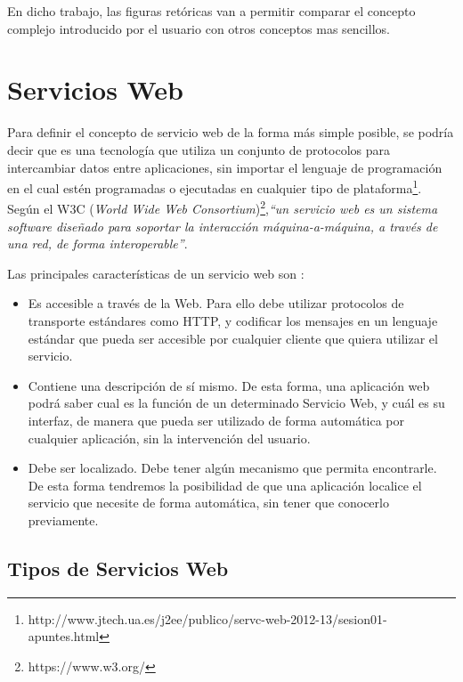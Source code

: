 En dicho trabajo, las figuras retóricas van a permitir comparar el concepto complejo introducido por el usuario con otros conceptos mas sencillos.

\section{Servicios Web}
\label{cap:sec:serviciosweb}

Para definir el concepto de servicio web de la forma más simple posible, se podría decir que es una tecnología que utiliza un conjunto de protocolos para intercambiar datos entre aplicaciones, sin importar el lenguaje de programación en el cual estén programadas o ejecutadas en cualquier tipo de plataforma\footnote{http://www.jtech.ua.es/j2ee/publico/servc-web-2012-13/sesion01-apuntes.html}. Según el W3C (\textit{World Wide Web Consortium})\footnote{https://www.w3.org/},\textit{``un servicio web es un sistema software diseñado para soportar la interacción máquina-a-máquina, a través de una red, de forma interoperable''}.




Las principales características de un servicio web son \citep{TorresJoaquin2017SC}:



\begin{itemize}
	\item Es accesible a través de la Web. Para ello debe utilizar protocolos de transporte estándares como HTTP, y codificar los mensajes en un lenguaje estándar que pueda ser accesible por cualquier cliente que quiera utilizar el servicio. 
	\item Contiene una descripción de sí mismo. De esta forma, una aplicación web podrá saber cual es la función de un determinado Servicio Web, y cuál es su interfaz, de manera que pueda ser utilizado de forma automática por cualquier aplicación, sin la intervención del usuario.
	\item Debe ser localizado. Debe tener algún mecanismo que permita encontrarle. De esta forma tendremos la posibilidad de que una aplicación localice el servicio que necesite de forma automática, sin tener que conocerlo previamente.
\end{itemize}

\subsection{Tipos de Servicios Web}
\label{cap:subsec:tiposserviciosweb}


